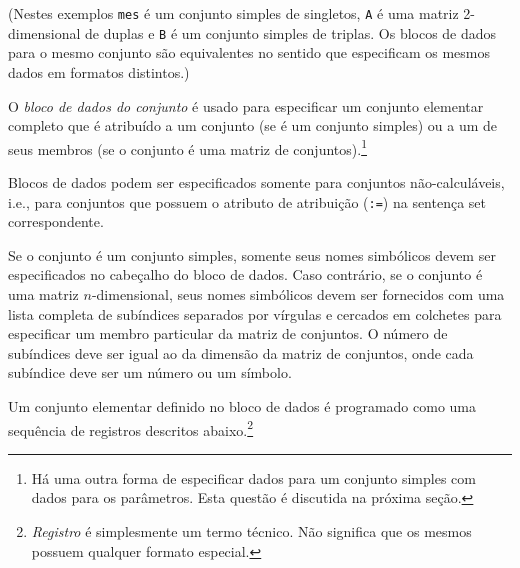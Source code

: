 \documentclass[11pt, brazil]{report}
\begin{document}
\noindent(Nestes exemplos {\tt mes} é um conjunto simples de singletos,
{\tt A} é uma matriz 2-dimensional de duplas e {\tt B} é um conjunto
simples de triplas. Os blocos de dados para o mesmo conjunto são equivalentes
no sentido que especificam os mesmos dados em formatos distintos.)

O {\it bloco de dados do conjunto} é usado para especificar um conjunto elementar
completo que é atribuído a um conjunto (se é um conjunto simples) ou a um de
seus membros (se o conjunto é uma matriz de conjuntos).\footnote{Há uma outra forma
de especificar dados para um conjunto simples com dados para os parâmetros.
Esta questão é discutida na próxima seção.}

Blocos de dados podem ser especificados somente para conjuntos não-calculáveis,
i.e., para \linebreak conjuntos que possuem o atributo de atribuição ({\tt:=})
na sentença set correspondente.

Se o conjunto é um conjunto simples, somente seus nomes simbólicos devem ser
especificados no cabeçalho do bloco de dados. Caso contrário, se o conjunto
é uma matriz $n$-dimensional, seus nomes simbólicos devem ser fornecidos com
uma lista completa de subíndices separados por vírgulas e cercados em colchetes
para especificar um membro particular da matriz de conjuntos. O número de
subíndices deve ser igual ao da dimensão da matriz de conjuntos, onde
cada subíndice deve ser um número ou um símbolo.

Um conjunto elementar definido no bloco de dados é programado como uma sequência
de \linebreak registros descritos abaixo.\footnote{{\it Registro} é simplesmente
um termo técnico. Não significa que os mesmos possuem qualquer formato
especial.}
\end{document}
